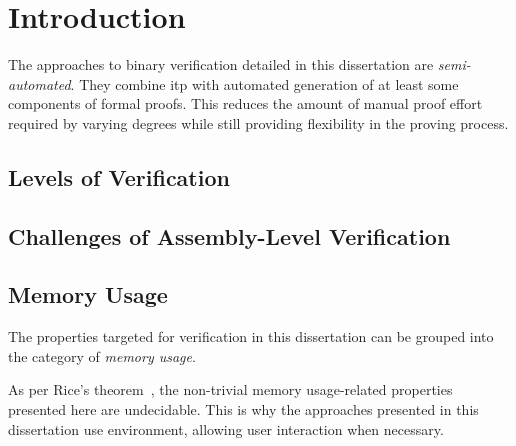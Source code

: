 \chapter{Introduction}
The approaches to binary verification detailed in this dissertation
are \emph{semi-automated}.
They combine \ac{itp} with automated generation
of at least some components of formal proofs.
This reduces the amount of manual proof effort required by varying degrees
while still providing flexibility in the proving process.


\section{Levels of Verification}  
\section{Challenges of Assembly-Level Verification}
\section{Memory Usage}
The properties targeted for verification in this dissertation
can be grouped into the category of \emph{memory usage}.


As per Rice's theorem~\citep{rice1953classes},
the non-trivial memory usage-related properties presented here are undecidable.
This is why the approaches presented in this dissertation
use  environment, allowing user interaction when necessary.
